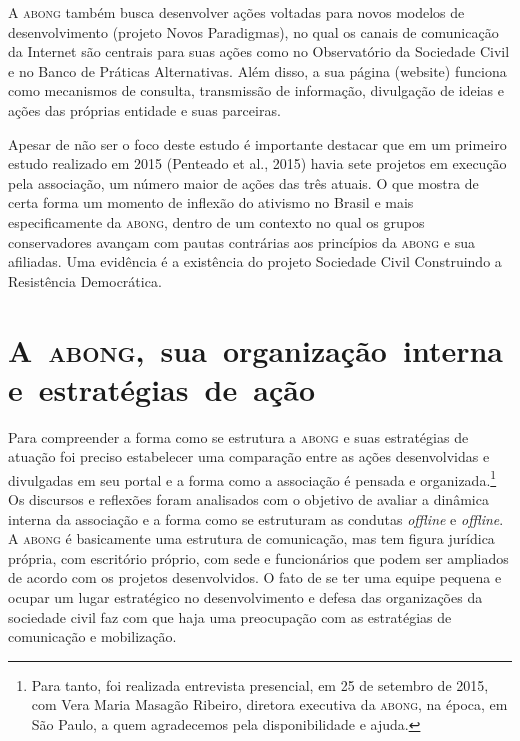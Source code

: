 A \textsc{abong} também busca desenvolver ações voltadas para novos modelos de
desenvolvimento (projeto Novos Paradigmas), no qual os canais de
comunicação da Internet são centrais para suas ações como no
Observatório da Sociedade Civil e no Banco de Práticas Alternativas.
Além disso, a sua página (website) funciona como mecanismos de consulta,
transmissão de informação, divulgação de ideias e ações das próprias
entidade e suas parceiras.

Apesar de não ser o foco deste estudo é importante destacar que em um
primeiro estudo realizado em 2015 (Penteado et al., 2015) havia sete
projetos em execução pela associação, um número maior de ações das três
atuais. O que mostra de certa forma um momento de inflexão do ativismo
no Brasil e mais especificamente da \textsc{abong}, dentro de um contexto no qual
os grupos conservadores avançam com pautas contrárias aos princípios da
\textsc{abong} e sua afiliadas. Uma evidência é a existência do projeto Sociedade
Civil Construindo a Resistência Democrática.

\section{A~\textsc{abong},~sua~organização~interna e~estratégias~de~ação}

\noindent{}Para compreender a forma como se estrutura a \textsc{abong} e suas estratégias de
atuação foi preciso estabelecer uma comparação entre as ações
desenvolvidas e divulgadas em seu portal e a forma como a associação é
pensada e organizada.\footnote{Para tanto, foi realizada entrevista
  presencial, em 25 de setembro de 2015, com Vera Maria Masagão Ribeiro,
  diretora executiva da \textsc{abong}, na época, em São Paulo, a quem
  agradecemos pela disponibilidade e ajuda.} Os discursos e reflexões
foram analisados com o objetivo de avaliar a dinâmica interna da
associação e a forma como se estruturam as condutas \emph{offline} e \emph{offline}.
A \textsc{abong} é basicamente uma estrutura de comunicação, mas tem figura
jurídica própria, com escritório próprio, com sede e funcionários que
podem ser ampliados de acordo com os projetos desenvolvidos. O fato de
se ter uma equipe pequena e ocupar um lugar estratégico no
desenvolvimento e defesa das organizações da sociedade civil faz com que
haja uma preocupação com as estratégias de comunicação e mobilização.


